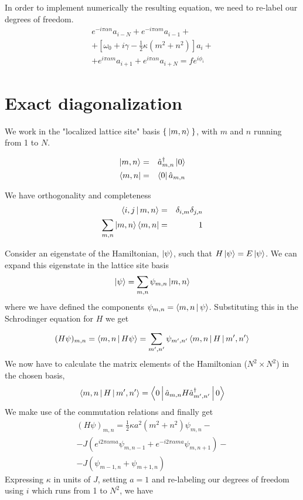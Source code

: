 \documentclass[a4paper,prb,10pt,aps,twocolumn]{revtex4-1}
\newcommand{\ketzero}{\ket{0}}
\newcommand{\brazero}{\bra{0}}
\begin{document}
In order to implement numerically the resulting equation, we need to re-label our degrees of freedom.
\begin{multline}
  \label{eq:13}
e^{-i \pi \alpha n}a_{i-N}+e^{-i\pi\alpha m}a_{i-1}+\\+\left[\omega_{0}+i\gamma-\frac{1}{2}\kappa(m^{2}+n^{2})\right]a_{i}+\\+e^{i\pi\alpha m}a_{i+1}+e^{i \pi \alpha n}a_{i+N}=fe^{i\phi_{i}}  
\end{multline}

\section{Exact diagonalization}
We work in the "localized lattice site" basis $\Set{\Ket{m,n}}$, with $m$ and $n$ running from 1 to $N$.

\begin{eqnarray}
  \label{eq:3}
  \Ket{m,n} &=& \hat{a}_{m,n}^{\dagger}\ketzero\\
  \Bra{m,n} &=& \brazero \hat{a}_{m,n}
\end{eqnarray}

We have orthogonality and completeness
\begin{eqnarray}
  \label{eq:5}
  \Braket{i,j|m,n} &=& \delta_{i,m}\delta_{j,n}\\
  \sum_{m,n}\Ket{m,n}\Bra{m,n} &=& 1
\end{eqnarray}

Consider an eigenstate of the Hamiltonian, $\Ket{\psi}$, such that $H\Ket{\psi} = E \Ket{\psi}$. We can expand this eigenstate in the lattice site basis
\begin{equation}
  \label{eq:7}
  \Ket{\psi} = \sum_{m,n} \psi_{m,n} \Ket{m,n}
\end{equation}
where we have defined the components $\psi_{m,n} =
\Braket{m,n|\psi}$.
Substituting this in the Schrodinger equation for $H$ we get

\begin{equation}
  \label{eq:11}
  (H\psi)_{m,n} = \Braket{m,n|H\psi} = \sum_{m^{\prime}, n^{\prime}} \psi_{m^{\prime}, n^{\prime}} \Braket{m,n|H|m^{\prime}, n^{\prime}}
\end{equation}
We now have to calculate the matrix elements of the Hamiltonian ($N^2 \times N^2$) in the chosen basis,
\begin{equation}
  \label{eq:14}
  \Braket{m,n|H|m^{\prime}, n^{\prime}} = \Braket{0|\hat{a}_{m,n}H\hat{a}^{\dagger}_{m^{\prime},n^{\prime}}|0}
\end{equation}
We make use of the commutation relations and finally get
\begin{multline}
  \label{eq:15}
  (H\psi)_{m,n} = \frac{1}{2}\kappa a^2 (m^2+n^2) \psi_{m,n}-\\
 -J\left(e^{i 2\pi \alpha m a} \psi_{m,n-1} + e^{-i 2\pi \alpha m a} \psi_{m,n+1}\right)-\\
 -J\left(\psi_{m-1,n} + \psi_{m+1,n}\right)
\end{multline}
Expressing $\kappa$ in units of $J$, setting $a=1$ and re-labeling our degrees of freedom using $i$ which runs from 1 to $N^2$, we have
\end{document}
